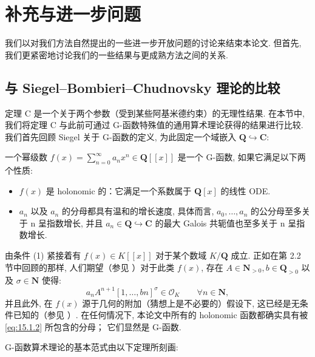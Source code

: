 \section{补充与进一步问题}\label{sec:15}

我们以对我们方法自然提出的一些进一步开放问题的讨论来结束本论文. 
但首先, 我们更紧密地讨论我们的一些结果与更成熟方法之间的关系.

\subsection{与 Siegel--Bombieri--Chudnovsky 理论的比较}\label{sec:15.1}

定理 C 是一个关于两个参数（受到某些阿基米德约束）的无理性结果. 
在本节中, 我们将定理 C 与此前可通过 G-函数特殊值的通用算术理论获得的结果进行比较. 
我们首先回顾 Siegel 关于 G-函数的定义, 
为此固定一个域嵌入 \(\mathbf{Q} \hookrightarrow \mathbf{C}\):

\begin{definition}[G-function]\label{def:15.1.1}
一个幂级数 \(f(x) = \sum_{n=0}^{\infty} a_n x^n \in \mathbf{Q}[\![x]\!]\) 是一个 G-函数, 
如果它满足以下两个性质:
\begin{itemize}
  \item[(1)] \(f(x)\) 是 holonomic 的：它满足一个系数属于 \(\mathbf{Q}[x]\) 的线性 ODE.
  \item[(2)] \(a_n\) 以及 \(a_n\) 的分母都具有温和的增长速度, 
  具体而言, \(a_0, \dots, a_n\) 的公分母至多关于 n 呈指数增长, 
  并且 \(a_n \in \mathbf{Q} \hookrightarrow \mathbf{C}\) 的最大 Galois 共轭值也至多关于 n 呈指数增长.
\end{itemize}
\end{definition}

由条件 (1) 紧接着有 \(f(x) \in K[\![x]\!]\) 对于某个数域 \(K/\mathbf{Q}\) 成立. 
正如在第 2.2 节中回顾的那样, 
人们期望（参见 \cite{FR17}）对于此类 \(f(x)\), 存在 \(A \in \mathbf{N}_{>0}, b \in \mathbf{Q}_{>0}\) 以及 \(\sigma \in \mathbf{N}\) 使得:
\begin{equation}\label{eq:15.1.2}
a_n A^{n+1} [1, \dots, bn]^{\sigma} \in \mathcal{O}_K \qquad \forall n \in \mathbf{N},
\end{equation}
并且此外, 在 \(f(x)\) 源于几何的附加（猜想上是不必要的）假设下, 
这已经是无条件已知的（参见 \cite[第 V 节附录]{And89}）. 
在任何情况下, 本论文中所有的 holonomic 函数都确实具有被 \eqref{eq:15.1.2} 所包含的分母； 
它们显然是 G-函数.

G-函数算术理论的基本范式由以下定理所刻画:

